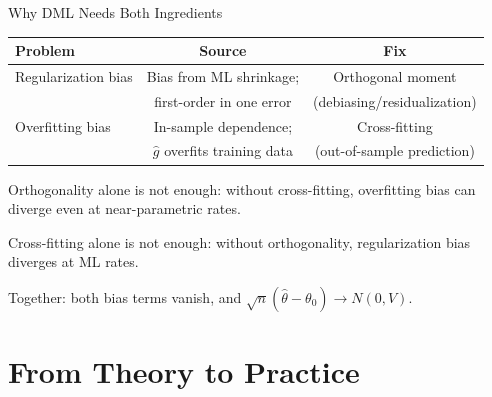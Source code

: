 \documentclass[aspectratio=169, 11pt, handout]{beamer}
\begin{document}
\begin{frame}{Why DML Needs Both Ingredients}

\begin{center}
\begin{tabular}{lcc}
\toprule
\textbf{Problem} & \textbf{Source} & \textbf{Fix} \\
\midrule
Regularization bias & Bias from ML shrinkage; & Orthogonal moment \\
 & first-order in one error & (debiasing/residualization) \\[0.5em]
Overfitting bias & In-sample dependence; & Cross-fitting \\
 & $\hat{g}$ overfits training data & (out-of-sample prediction) \\
\bottomrule
\end{tabular}
\end{center}

\bigskip
\pause

Orthogonality alone is not enough: without cross-fitting, overfitting bias can diverge even at near-parametric rates.

\bigskip

Cross-fitting alone is not enough: without orthogonality, regularization bias diverges at ML rates.

\bigskip

Together: both bias terms vanish, and $\sqrt{n}(\hat{\theta} - \theta_0) \to N(0, V)$.

\end{frame}



\section{From Theory to Practice}
\end{document}
